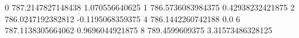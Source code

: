 0 787.2147827148438 1.070556640625
1 786.5736083984375 0.42938232421875
2 786.0247192382812 -0.1195068359375
4 786.1442260742188 0.0
6 787.1138305664062 0.9696044921875
8 789.4599609375 3.31573486328125

